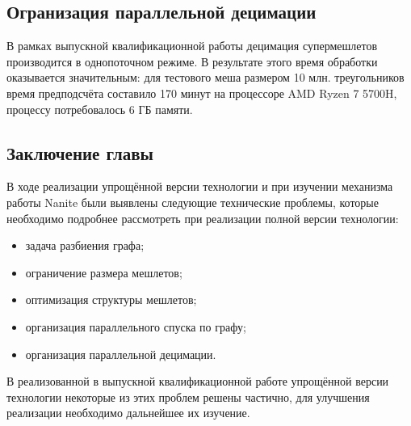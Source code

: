 \subsection*{Огранизация параллельной децимации}
В рамках выпускной квалификационной работы децимация супермешлетов производится в однопоточном режиме.
В результате этого время обработки оказывается значительным: для тестового меша размером 10 млн. треугольников время предподсчёта составило 170 минут на процессоре AMD Ryzen 7 5700H, процессу потребовалось 6 ГБ памяти.

\subsection*{Заключение главы}
В ходе реализации упрощённой версии технологии и при изучении механизма работы Nanite были выявлены следующие технические проблемы, которые необходимо подробнее рассмотреть при реализации полной версии технологии:
\begin{itemize}
    \item задача разбиения графа;
    \item ограничение размера мешлетов;
    \item оптимизация структуры мешлетов;
    \item организация параллельного спуска по графу;
    \item организация параллельной децимации.
\end{itemize}

В реализованной в выпускной квалификационной работе упрощённой версии технологии некоторые из этих проблем решены частично, для улучшения реализации необходимо дальнейшее их изучение.
